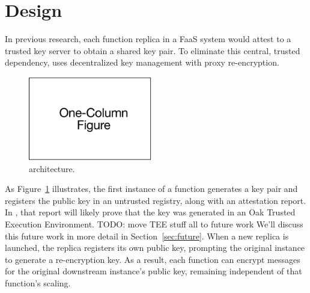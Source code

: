 \section{Design}
\label{sec:design}


%
In previous research, each function replica in a FaaS system would attest to a trusted key
server to obtain a shared key pair.
%
To eliminate this central, trusted dependency, \SystemName
uses decentralized key management with proxy re-encryption.
%
\begin{figure}
    \centering
    \includegraphics[page = 4, width=0.48\textwidth]{diagrams/slides.pdf}
    \caption{\SystemName architecture.}
    \label{fig:arch}
\end{figure}
%
As Figure~\ref{fig:arch} illustrates, the first instance of a function
generates a key pair and registers the public key in an untrusted registry,
along with an attestation report.
%
In \SystemName, that report will likely prove that the key was generated in an Oak
Trusted Execution Environment\@.
\color{red}TODO: move TEE stuff all to future work\color{black}
%
We'll discuss this future work in more detail in Section~\ref{sec:future}.
%
When a new replica is launched, the replica registers its own public key,
prompting the original instance to generate a re-encryption key.
%
%
As a result, each function can encrypt messages for the original downstream
instance's public key, remaining independent of that function's scaling.




